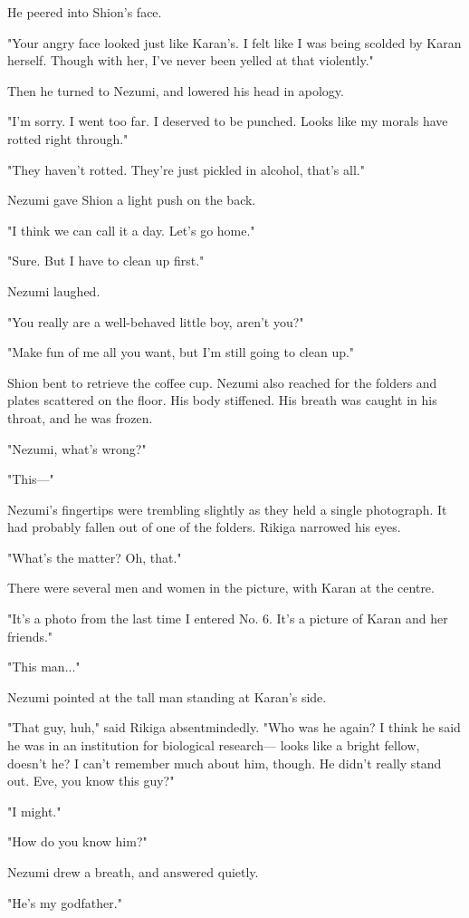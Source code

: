 He peered into Shion's face.

"Your angry face looked just like Karan's. I felt like I was being
scolded by Karan herself. Though with her, I've never been yelled at
that violently."

Then he turned to Nezumi, and lowered his head in apology.

"I'm sorry. I went too far. I deserved to be punched. Looks like my
morals have rotted right through."

"They haven't rotted. They're just pickled in alcohol, that's all."

Nezumi gave Shion a light push on the back.

"I think we can call it a day. Let's go home."

"Sure. But I have to clean up first."

Nezumi laughed.

"You really are a well-behaved little boy, aren't you?"

"Make fun of me all you want, but I'm still going to clean up."

Shion bent to retrieve the coffee cup. Nezumi also reached for the
folders and plates scattered on the floor. His body stiffened. His
breath was caught in his throat, and he was frozen.

"Nezumi, what's wrong?"

"This---"

Nezumi's fingertips were trembling slightly as they held a single
photograph. It had probably fallen out of one of the folders. Rikiga
narrowed his eyes.

"What's the matter? Oh, that."

There were several men and women in the picture, with Karan at the
centre.

"It's a photo from the last time I entered No. 6. It's a picture of
Karan and her friends."

"This man..."

Nezumi pointed at the tall man standing at Karan's side.

"That guy, huh," said Rikiga absentmindedly. "Who was he again? I think
he said he was in an institution for biological research--- looks like a
bright fellow, doesn't he? I can't remember much about him, though. He
didn't really stand out. Eve, you know this guy?"

"I might."

"How do you know him?"

Nezumi drew a breath, and answered quietly.

"He's my godfather."